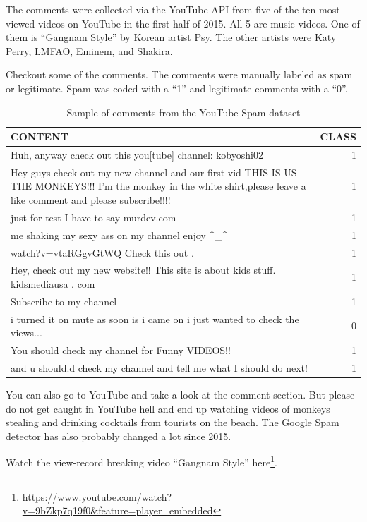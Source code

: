 \documentclass[
  11pt,
]{scrbook}
\renewcommand{\href}[2]{#2\footnote{\url{#1}}}
\begin{document}
The comments were collected via the YouTube API from five of the ten most viewed videos on YouTube in the first half of 2015.
All 5 are music videos.
One of them is ``Gangnam Style'' by Korean artist Psy.
The other artists were Katy Perry, LMFAO, Eminem, and Shakira.

Checkout some of the comments.
The comments were manually labeled as spam or legitimate.
Spam was coded with a ``1'' and legitimate comments with a ``0''.

\begin{table}

\caption{\label{tab:show-dating-data-TubeSpam}Sample of comments from the YouTube Spam dataset}
\centering
\begin{tabular}[t]{>{\raggedright\arraybackslash}p{10cm}r}
\toprule
CONTENT & CLASS\\
\midrule
Huh, anyway check out this you[tube] channel: kobyoshi02 & 1\\
Hey guys check out my new channel and our first vid THIS IS US THE  MONKEYS!!! I'm the monkey in the white shirt,please leave a like comment  and please subscribe!!!! & 1\\
just for test I have to say murdev.com & 1\\
me shaking my sexy ass on my channel enjoy \textasciicircum{}\_\textasciicircum{} & 1\\
watch?v=vtaRGgvGtWQ   Check this out . & 1\\
\addlinespace
Hey, check out my new website!! This site is about kids stuff. kidsmediausa  . com & 1\\
Subscribe to my channel & 1\\
i turned it on mute as soon is i came on i just wanted to check the  views... & 0\\
You should check my channel for Funny VIDEOS!! & 1\\
and u should.d check my channel and tell me what I should do next! & 1\\
\bottomrule
\end{tabular}
\end{table}

You can also go to YouTube and take a look at the comment section.
But please do not get caught in YouTube hell and end up watching videos of monkeys stealing and drinking cocktails from tourists on the beach.
The Google Spam detector has also probably changed a lot since 2015.

\href{https://www.youtube.com/watch?v=9bZkp7q19f0\&feature=player_embedded}{Watch the view-record breaking video ``Gangnam Style'' here}.
\end{document}
